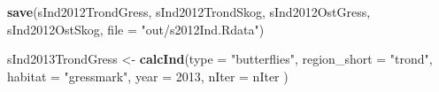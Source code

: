\documentclass[]{article}
\newenvironment{Shaded}{\begin{snugshade}}{\end{snugshade}}
\newcommand{\KeywordTok}[1]{\textcolor[rgb]{0.13,0.29,0.53}{\textbf{#1}}}
\newcommand{\DataTypeTok}[1]{\textcolor[rgb]{0.13,0.29,0.53}{#1}}
\newcommand{\DecValTok}[1]{\textcolor[rgb]{0.00,0.00,0.81}{#1}}
\newcommand{\StringTok}[1]{\textcolor[rgb]{0.31,0.60,0.02}{#1}}
\newcommand{\NormalTok}[1]{#1}
\begin{document}
\begin{Shaded}
\begin{Highlighting}[]
\KeywordTok{save}\NormalTok{(sInd2012TrondGress, sInd2012TrondSkog, sInd2012OstGress, sInd2012OstSkog, }\DataTypeTok{file =} \StringTok{"out/s2012Ind.Rdata"}\NormalTok{)}
\end{Highlighting}
\end{Shaded}

\begin{Shaded}
\begin{Highlighting}[]
\NormalTok{sInd2013TrondGress <-}\StringTok{ }\KeywordTok{calcInd}\NormalTok{(}\DataTypeTok{type =} \StringTok{"butterflies"}\NormalTok{,}
                              \DataTypeTok{region_short =} \StringTok{"trond"}\NormalTok{,}
                              \DataTypeTok{habitat =} \StringTok{"gressmark"}\NormalTok{,}
                              \DataTypeTok{year =} \DecValTok{2013}\NormalTok{,}
                              \DataTypeTok{nIter =}\NormalTok{ nIter}
\NormalTok{                              )}
       

\end{Highlighting}
\end{Shaded}
\end{document}
